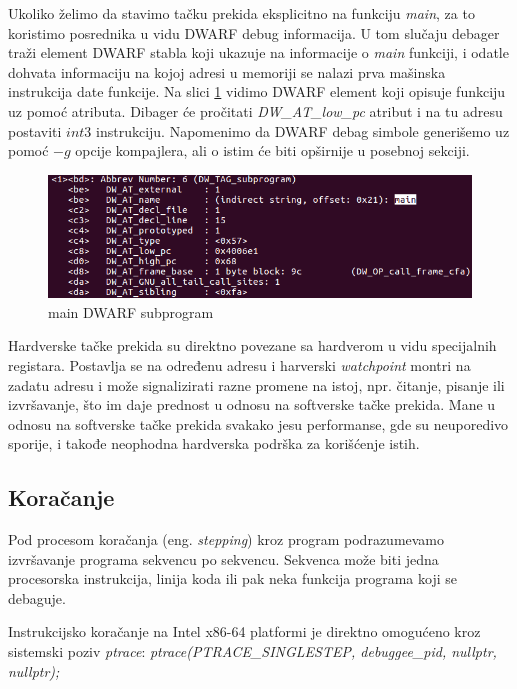\documentclass[12pt,oneside]{memoir}
\begin{document}
Ukoliko želimo da stavimo tačku prekida eksplicitno na funkciju \emph{main}, za to koristimo posrednika u vidu DWARF debug informacija. U tom slučaju debager traži element DWARF stabla koji ukazuje na informacije o \emph{main} funkciji, i odatle dohvata informaciju na kojoj adresi u memoriji se nalazi prva mašinska instrukcija date funkcije. Na slici \ref{fig:mainsub} vidimo DWARF element koji opisuje funkciju uz pomoć atributa. Dibager će pročitati \emph{DW\_AT\_low\_pc} atribut i na tu adresu postaviti $ int3 $ instrukciju. Napomenimo da DWARF debag simbole generišemo uz pomoć $ -g $ opcije kompajlera, ali o istim će biti opširnije u posebnoj sekciji.

\begin{figure}[h!]
	\begin{center}
		\includegraphics[scale=0.4]{slike/main_subprogram.png}
	\end{center}
	\caption{main DWARF subprogram}
	\label{fig:mainsub}
\end{figure}

Hardverske tačke prekida su direktno povezane sa hardverom u vidu specijalnih registara. Postavlja se na određenu adresu i harverski \emph{watchpoint} montri na zadatu adresu i može signalizirati razne promene na istoj, npr. čitanje, pisanje ili izvršavanje, što im daje prednost u odnosu na softverske tačke prekida. Mane u odnosu na softverske tačke prekida svakako jesu performanse, gde su neuporedivo sporije, i takođe neophodna hardverska podrška za korišćenje istih.

\subsection{Koračanje}

Pod procesom koračanja (eng. \emph{stepping}) kroz program podrazumevamo izvršavanje programa sekvencu po sekvencu. Sekvenca može biti jedna procesorska instrukcija, linija koda ili pak neka funkcija programa koji se debaguje.

Instrukcijsko koračanje na Intel x86-64 platformi je direktno omogućeno kroz sistemski poziv \emph{ptrace}:\newline\newline
\emph{ptrace(PTRACE\_SINGLESTEP, debuggee\_pid, nullptr, nullptr);}
\newline
\end{document}
